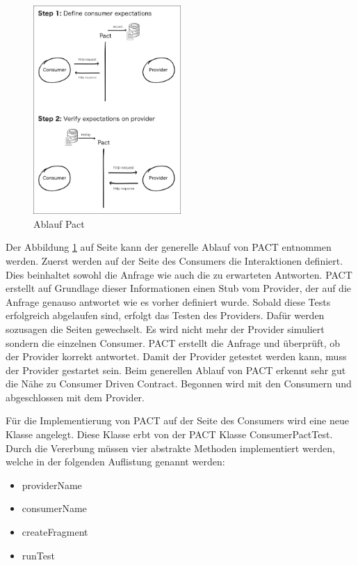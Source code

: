 \documentclass{llncs}
\begin{document}
\begin{figure}[htbp]
  \centering
      \includegraphics[width=0.5\textwidth]{./Images/pact}
    \caption{Ablauf Pact}
    \label{fig:Pact}
\end{figure}

Der Abbildung \ref{fig:Pact} auf Seite \pageref{fig:Pact} kann der generelle Ablauf von PACT entnommen werden. Zuerst werden auf der Seite des Consumers die Interaktionen definiert. Dies beinhaltet sowohl die Anfrage wie auch die zu erwarteten Antworten. PACT erstellt auf Grundlage dieser Informationen einen Stub vom Provider, der auf die Anfrage genauso antwortet wie es vorher definiert wurde. Sobald diese Tests erfolgreich abgelaufen sind, erfolgt das Testen des Providers. Dafür werden sozusagen die Seiten gewechselt. Es wird nicht mehr der Provider simuliert sondern die einzelnen Consumer. PACT erstellt die Anfrage und überprüft, ob der Provider korrekt antwortet. Damit der Provider getestet werden kann, muss der Provider gestartet sein. Beim generellen Ablauf von PACT erkennt sehr gut die Nähe zu Consumer Driven Contract. Begonnen wird mit den Consumern und abgeschlossen mit dem Provider.

Für die Implementierung von PACT auf der Seite des Consumers wird eine neue Klasse angelegt. Diese Klasse erbt von der PACT Klasse ConsumerPactTest. Durch die Vererbung müssen vier abstrakte Methoden implementiert werden, welche in der folgenden Auflistung genannt werden:
\begin{itemize}
\item providerName
\item consumerName
\item createFragment
\item runTest
\end{itemize}
\end{document}
